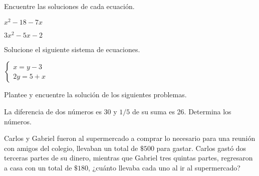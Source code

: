 \documentclass[sin curso]{srs}
\begin{document}
Encuentre las soluciones de cada ecuación.
\begin{preguntas}
  \pregunta $x^2-18-7x$
  \begin{malla}[height=5cm]
  \end{malla}
  \pregunta $3x^2-5x-2$
  \begin{malla}[height=6.5cm]
  \end{malla}
\end{preguntas}

Solucione el siguiente sistema de ecuaciones.
\begin{preguntas}
  \pregunta $\begin{cases}
    x = y-3 \\
    2y = 5+x
  \end{cases}$
  \begin{malla}[height=5cm]
  \end{malla}
\end{preguntas}

Plantee y encuentre la solución de los siguientes problemas.
\begin{preguntas}
  \pregunta La diferencia de dos números es 30 y $1/5$ de su suma es 26. Determina los
  números.
  \begin{malla}[height=7cm]
  \end{malla}
  \pregunta Carlos y Gabriel fueron al supermercado a comprar lo necesario para una
  reunión con amigos del colegio, llevaban un total de $\$500$ para gastar. Carlos gastó
  dos terceras partes de su dinero, mientras que Gabriel tres quintas partes, regresaron
  a casa con un total de $\$180$, ¿cuánto llevaba cada uno al ir al supermercado?
  \begin{malla}[height=7cm]
  \end{malla}
\end{preguntas}
\end{document}
